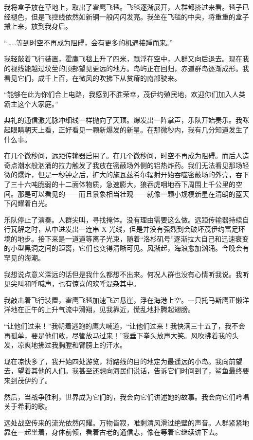 \documentclass[AutoFakeBold=true]{book}
\begin{document}
我将盒子放在草地上，取出了霍鹰飞毯。飞毯逐渐展开，人群都挤过来看。毯子已经褪色，但是飞控线依然如新铜一般闪闪发亮。我坐在飞毯的中央，将重重的盒子搬上来，放到我身后。

``……等到时空不再成为阻碍，会有更多的机遇接踵而来。''

我轻敲着飞行装置，霍鹰飞毯上升了四米，飘浮在空中，人群又向后退去。现在我的视线能越过坟茔的顶部望见更远的地方。岛屿正在回归，赤道群岛逐渐成形。我看见它们，成千上百，在微风的吹拂下从贫瘠的南部驶来。

``能够在此为你们合上电路，我感到不胜荣幸，茂伊约殖民地，欢迎你们加入人类霸主这个大家庭。''

典礼的通信激光脉冲细线一样抛向了天顶。爆发出一阵掌声，乐队开始奏乐。我眯起眼睛朝天上看，正好看见一颗新爆发的新星。在那微秒内，我有几分知道发生了什么事。

在几个微秒间，远距传输器启用了。在几个微秒间，时空不再成为阻碍。而后人造奇点潮水般汹涌的拉力触发了我放在密蔽场外侧的铝热炸药。我们无法看见那场轻微的爆炸，但是一秒钟之后，扩大的施瓦兹希尔辐射开始吞噬密蔽场的外壳，吞下了三十六吨脆弱的十二面体物质，急速膨大，狼吞虎咽地吞下周围上千公里的空间。那是可以看见的——而且景象相当壮观——就像一颗小规模新星在清朗的蓝天下闪耀着白光。

乐队停止了演奏。人群尖叫，寻找掩体。没有理由需要这么做。远距传输器持续自行瓦解之时，从中进发出一连串 X 光线，但是并没有强烈到会破坏茂伊约富足环境的地步。接下来是一道道等离子光束，随着``洛杉矶号''逐渐拉大自己和迅速衰变的小型黑洞之间的距离，它们也变得清晰可见。风渐起，海浪愈加汹涌。今晚会有罕见的海潮。

我想说点意义深远的话但是我什么都想不出来。何况人群也没有心情听我说。我听见尖叫和呼喊声，也有惊喜的欢呼混杂其中。

我敲击着飞行装置，霍鹰飞毯加速飞过悬崖，浮在海港上空。一只托马斯鹰正懒洋洋地在正午的上升气流中滑翔，见我靠近，慌乱地扑腾起翅膀。

``让他们过来！''我朝着逃跑的鹰大喊道，``让他们过来！我快满三十五了，我不会再孤单，要是他们敢，尽管放马过来！''我垂下拳头放声大笑。风吹拂着我的头发，凉爽地拂过我胸膛和臂膀上的汗水。

现在凉快多了，我开始四处游览，将路线的目的地定为最遥远的小岛。我向前望去，望着其他的人们。我甚至还想向海民们说话，告诉它们时间到了，鲨鱼最终要来到茂伊约了。

然后，当战争胜利，世界成为它们的，我会向它们讲述她的故事。我会向它们吟唱关于希莉的歌。

\vspace*{1em}

远处战空传来的流光依然闪耀。万物皆寂，唯剩清风滑过绝壁的声音。人群紧紧地靠在一起坐着，身体前倾，看着古老的通信志，像在等着它继续讲下去。
\end{document}
